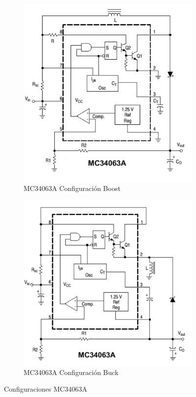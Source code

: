 \begin{figure}[h]
  \centering
  \begin{subfigure}{0.4\linewidth}
    \includegraphics[width=\textwidth]{Pictures/Esquematico_Boost_Converter.png}
    \caption{MC34063A Configuración Boost}
    \label{fig:BoostMC}
  \end{subfigure}
  \begin{subfigure}{0.42\linewidth}
    \includegraphics[width=\textwidth]{Pictures/Esquematico_Buck_Converter.png}
    \caption{MC34063A Configuración Buck}
    \label{fig:BuckMC}
  \end{subfigure}
  \caption{Configuraciones MC34063A}
\end{figure}

